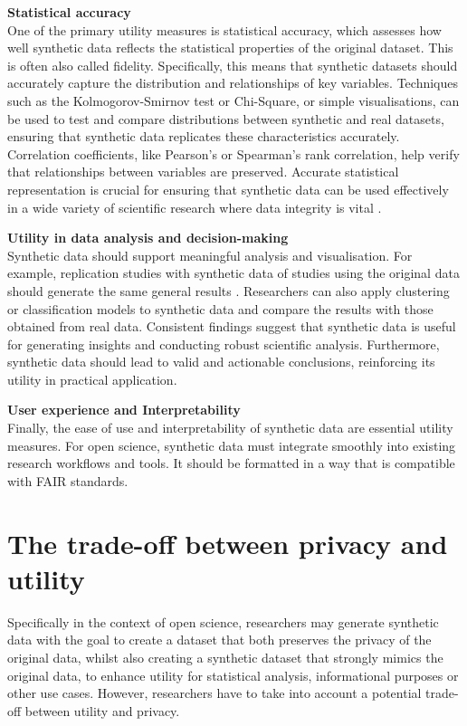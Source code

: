 \textbf{Statistical accuracy} \\
One of the primary utility measures is statistical accuracy, which assesses how well synthetic data reflects the statistical properties of the original dataset. This is often also called fidelity. Specifically, this means that synthetic datasets should accurately capture the distribution and relationships of key variables. Techniques such as the Kolmogorov-Smirnov test or Chi-Square, or simple visualisations, can be used to test and compare distributions between synthetic and real datasets, ensuring that synthetic data replicates these characteristics accurately. Correlation coefficients, like Pearson's or Spearman's rank correlation, help verify that relationships between variables are preserved. Accurate statistical representation is crucial for ensuring that synthetic data can be used effectively in a wide variety of scientific research where data integrity is vital \cite{dankar2021fake,el2020seven,arnold2020really}.

\textbf{Utility in data analysis and decision-making} \\
Synthetic data should support meaningful analysis and visualisation. For example, replication studies with synthetic data of studies using the original data should generate the same general results \cite{braddon2023exploring}. Researchers can also apply clustering or classification models to synthetic data and compare the results with those obtained from real data. Consistent findings suggest that synthetic data is useful for generating insights and conducting robust scientific analysis. Furthermore, synthetic data should lead to valid and actionable conclusions, reinforcing its utility in practical application.

\textbf{User experience and Interpretability} \\
Finally, the ease of use and interpretability of synthetic data are essential utility measures. For open science, synthetic data must integrate smoothly into existing research workflows and tools. It should be formatted in a way that is compatible with FAIR standards.


\section{The trade-off between privacy and utility}

Specifically in the context of open science, researchers may generate synthetic data with the goal to create a dataset that both preserves the privacy of the original data, whilst also creating a synthetic dataset that strongly mimics the original data, to enhance utility for statistical analysis, informational purposes or other use cases. However, researchers have to take into account a potential trade-off between utility and privacy.

